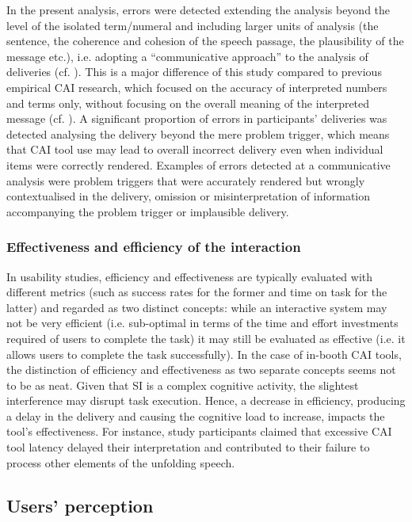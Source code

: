 In the present analysis, errors were detected extending the analysis beyond the level of the isolated term/numeral and including larger units of analysis (the sentence, the coherence and cohesion of the speech passage, the plausibility of the message etc.), i.e. adopting a ``communicative approach'' to the analysis of deliveries (cf. ). This is a major difference of this study compared to previous empirical CAI research, which focused on the accuracy of interpreted numbers and terms only, without focusing on the overall meaning of the interpreted message (cf. ). A significant proportion of errors in participants’ deliveries was detected analysing the delivery beyond the mere problem trigger, which means that CAI tool use may lead to overall incorrect delivery even when individual items were correctly rendered. Examples of errors detected at a communicative analysis were problem triggers that were accurately rendered but wrongly contextualised in the delivery, omission or misinterpretation of information accompanying the problem trigger or implausible delivery.


\subsubsection{Effectiveness and efficiency of the interaction}

In usability studies, efficiency and effectiveness are typically evaluated with different metrics (such as success rates for the former and time on task for the latter) and regarded as two distinct concepts: while an interactive system may not be very efficient (i.e. sub-optimal in terms of the time and effort investments required of users to complete the task) it may still be evaluated as effective (i.e. it allows users to complete the task successfully). In the case of in-booth CAI tools, the distinction of efficiency and effectiveness as two separate concepts seems not to be as neat. Given that SI is a complex cognitive activity, the slightest interference may disrupt task execution. Hence, a decrease in efficiency, producing a delay in the delivery and causing the cognitive load to increase, impacts the tool’s effectiveness. For instance, study participants claimed that excessive CAI tool latency delayed their interpretation and contributed to their failure to process other elements of the unfolding speech.


\subsection{Users' perception}



